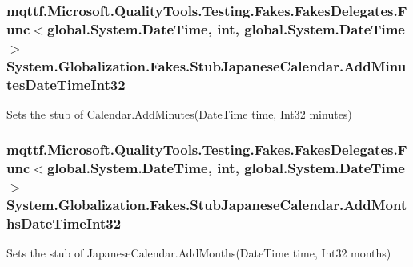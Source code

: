 \hypertarget{class_system_1_1_globalization_1_1_fakes_1_1_stub_japanese_calendar_a5e5accf2b7c529221f5af3ab86621dac}{
\subsubsection[{Add\-Minutes\-Date\-Time\-Int32}]{\setlength{\rightskip}{0pt plus 5cm}mqttf.\-Microsoft.\-Quality\-Tools.\-Testing.\-Fakes.\-Fakes\-Delegates.\-Func$<$global.\-System.\-Date\-Time, int, global.\-System.\-Date\-Time$>$ System.\-Globalization.\-Fakes.\-Stub\-Japanese\-Calendar.\-Add\-Minutes\-Date\-Time\-Int32}}\label{class_system_1_1_globalization_1_1_fakes_1_1_stub_japanese_calendar_a5e5accf2b7c529221f5af3ab86621dac}


Sets the stub of Calendar.\-Add\-Minutes(\-Date\-Time time, Int32 minutes)

\hypertarget{class_system_1_1_globalization_1_1_fakes_1_1_stub_japanese_calendar_ae5cdbd09e8c4c6ab1d623eff517aa014}{
\subsubsection[{Add\-Months\-Date\-Time\-Int32}]{\setlength{\rightskip}{0pt plus 5cm}mqttf.\-Microsoft.\-Quality\-Tools.\-Testing.\-Fakes.\-Fakes\-Delegates.\-Func$<$global.\-System.\-Date\-Time, int, global.\-System.\-Date\-Time$>$ System.\-Globalization.\-Fakes.\-Stub\-Japanese\-Calendar.\-Add\-Months\-Date\-Time\-Int32}}\label{class_system_1_1_globalization_1_1_fakes_1_1_stub_japanese_calendar_ae5cdbd09e8c4c6ab1d623eff517aa014}


Sets the stub of Japanese\-Calendar.\-Add\-Months(\-Date\-Time time, Int32 months)

